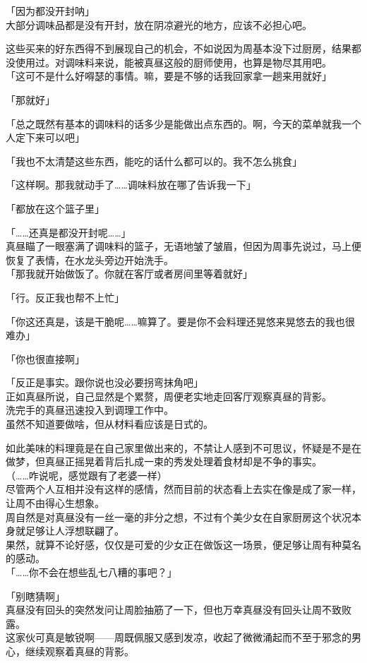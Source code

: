「因为都没开封呐」\\

大部分调味品都是没有开封，放在阴凉避光的地方，应该不必担心吧。

这些买来的好东西得不到展现自己的机会，不如说因为周基本没下过厨房，结果都没使用过。对调味料来说，能被真昼这般的厨师使用，也算是物尽其用吧。\\

「这可不是什么好嘚瑟的事情。嘛，要是不够的话我回家拿一趟来用就好」

「那就好」

「总之既然有基本的调味料的话多少是能做出点东西的。啊，今天的菜单就我一个人定下来可以吧」

「我也不太清楚这些东西，能吃的话什么都可以的。我不怎么挑食」

「这样啊。那我就动手了……调味料放在哪了告诉我一下」

「都放在这个篮子里」

「……还真是都没开封呢……」\\

真昼瞄了一眼塞满了调味料的篮子，无语地皱了皱眉，但因为周事先说过，马上便恢复了表情，在水龙头旁边开始洗手。\\

「那我就开始做饭了。你就在客厅或者房间里等着就好」

「行。反正我也帮不上忙」

「你这还真是，该是干脆呢……嘛算了。要是你不会料理还晃悠来晃悠去的我也很难办」

「你也很直接啊」

「反正是事实。跟你说也没必要拐弯抹角吧」\\

正如真昼所说，自己显然是个累赘，周便老实地走回客厅观察真昼的背影。\\

洗完手的真昼迅速投入到调理工作中。\\

虽然不知道要做啥，但从材料看应该是日式的。

如此美味的料理竟是在自己家里做出来的，不禁让人感到不可思议，怀疑是不是在做梦，但真昼正摇晃着背后扎成一束的秀发处理着食材却是不争的事实。\\

（……咋说呢，感觉跟有了老婆一样）\\

尽管两个人互相并没有这样的感情，然而目前的状态看上去实在像是成了家一样，让周不由得心生想象。\\

周自然是对真昼没有一丝一毫的非分之想，不过有个美少女在自家厨房这个状况本身就足够让人浮想联翩了。\\

果然，就算不论好感，仅仅是可爱的少女正在做饭这一场景，便足够让周有种莫名的感动。\\

「……你不会在想些乱七八糟的事吧？」

「别瞎猜啊」\\

真昼没有回头的突然发问让周脸抽筋了一下，但也万幸真昼没有回头让周不致败露。\\

这家伙可真是敏锐啊——周既佩服又感到发凉，收起了微微涌起而不至于邪念的男心，继续观察着真昼的背影。
